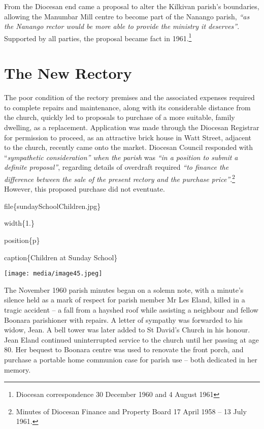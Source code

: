 From the Diocesan end came a proposal to alter the Kilkivan parish's boundaries, allowing the Manumbar Mill centre to become part of the Nanango parish, \emph{``as the Nanango rector would be more able to provide the ministry it deserves''}. Supported by all parties, the proposal became fact in 1961.\footnote{Diocesan correspondence 30 December 1960 and 4 August 1961}

\hypertarget{the-new-rectory}{%
\section{The New Rectory}\label{the-new-rectory}}

The poor condition of the rectory premises and the associated expenses required to complete repairs and maintenance, along with its considerable distance from the church, quickly led to proposals to purchase of a more suitable, family dwelling, as a replacement. Application was made through the Diocesan Registrar for permission to proceed, as an attractive brick house in Watt Street, adjacent to the church, recently came onto the market. Diocesan Council responded with ``\emph{sympathetic consideration'' when the parish} was \emph{``in a position to submit a definite proposal''}, regarding details of overdraft required \emph{``to finance the difference between the sale of the present rectory and the purchase price''}.\footnote{Minutes of Diocesan Finance and Property Board 17 April 1958 -- 13 July 1961.} However, this proposed purchase did not eventuate.

file\{sundaySchoolChildren.jpg\}

width\{1.\}

position\{p\}

caption\{Children at Sunday School\}

\texttt{[image: media/image45.jpeg]}

The November 1960 parish minutes began on a solemn note, with a minute's silence held as a mark of respect for parish member Mr Les Eland, killed in a tragic accident -- a fall from a hayshed roof while assisting a neighbour and fellow Boonara parishioner with repairs. A letter of sympathy was forwarded to his widow, Jean. A bell tower was later added to St David's Church in his honour. Jean Eland continued uninterrupted service to the church until her passing at age 80. Her bequest to Boonara centre was used to renovate the front porch, and purchase a portable home communion case for parish use -- both dedicated in her memory.


